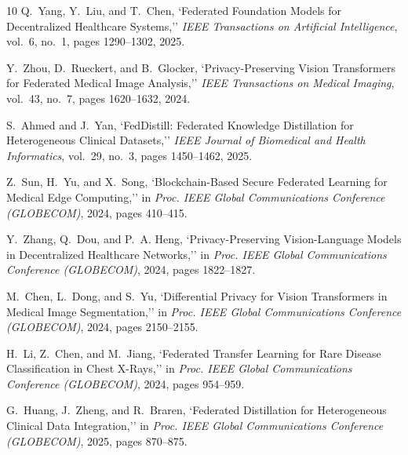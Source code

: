 \documentclass[conference]{IEEEtran}
\begin{document}
\begin{thebibliography}{10}
Q.~Yang, Y.~Liu, and T.~Chen,
`Federated Foundation Models for Decentralized Healthcare Systems,''
\emph{IEEE Transactions on Artificial Intelligence}, vol.\ 6, no.\ 1, pages 1290--1302, 2025.

Y.~Zhou, D.~Rueckert, and B.~Glocker,
`Privacy-Preserving Vision Transformers for Federated Medical Image Analysis,''
\emph{IEEE Transactions on Medical Imaging}, vol.\ 43, no.\ 7, pages 1620--1632, 2024.

S.~Ahmed and J.~Yan,
`FedDistill: Federated Knowledge Distillation for Heterogeneous Clinical Datasets,''
\emph{IEEE Journal of Biomedical and Health Informatics}, vol.\ 29, no.\ 3, pages 1450--1462, 2025.

Z.~Sun, H.~Yu, and X.~Song,
`Blockchain-Based Secure Federated Learning for Medical Edge Computing,''
in \emph{Proc. IEEE Global Communications Conference (GLOBECOM)}, 2024, pages 410--415.

Y.~Zhang, Q.~Dou, and P.~A. Heng,
`Privacy-Preserving Vision-Language Models in Decentralized Healthcare Networks,''
in \emph{Proc. IEEE Global Communications Conference (GLOBECOM)}, 2024, pages 1822--1827.

M.~Chen, L.~Dong, and S.~Yu,
`Differential Privacy for Vision Transformers in Medical Image Segmentation,''
in \emph{Proc. IEEE Global Communications Conference (GLOBECOM)}, 2024, pages 2150--2155.

H.~Li, Z.~Chen, and M.~Jiang,
`Federated Transfer Learning for Rare Disease Classification in Chest X-Rays,''
in \emph{Proc. IEEE Global Communications Conference (GLOBECOM)}, 2024, pages 954--959.

G.~Huang, J.~Zheng, and R.~Braren,
`Federated Distillation for Heterogeneous Clinical Data Integration,''
in \emph{Proc. IEEE Global Communications Conference (GLOBECOM)}, 2025, pages 870--875.
\end{thebibliography}
\end{document}
